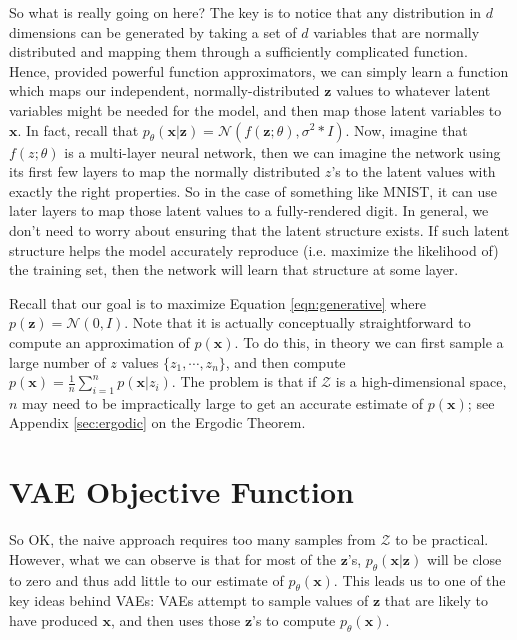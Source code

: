 \documentclass[11pt, oneside]{article}   	%
\begin{document}
\bigskip
\noindent
So what is really going on here? The key is to notice that any distribution in $d$ dimensions can be generated by taking a set of $d$ variables that are normally distributed and mapping them through a sufficiently complicated function. Hence, provided powerful function approximators, we can simply learn a function which maps our independent, normally-distributed $\mathbf{z}$ values to whatever latent variables might be needed for the model, and then map those latent variables to $\mathbf{x}$. In fact, recall that $p_{\theta}(\mathbf{x}|\mathbf{z}) = \mathcal{N}(f (\mathbf{z}; \theta), \sigma^2 * I)$. Now, imagine that  $f (z; \theta)$ is a multi-layer neural network, then we can imagine the network using its first few layers to map the normally distributed $z$'s to the latent values with exactly the right properties.  So in the case of something like MNIST, it can use later layers to map those latent values to a fully-rendered digit. In general, we don't need to worry about ensuring that the latent structure exists. If such latent structure helps the model accurately reproduce (i.e. maximize the likelihood of) the training set, then the network will learn that structure at some layer.

\bigskip
\noindent
Recall that our goal is to maximize Equation \ref{eqn:generative} where $p(\mathbf{z}) = \mathcal{N}(0,I)$. 
Note that it is actually conceptually straightforward to compute an approximation of $p(\mathbf{x})$. To do this, in theory we can first sample a large number of $z$ values $\{z_1, \cdots, z_n\}$, and then compute 
$p(\mathbf{x}) = \frac{1}{n} \sum\limits_{i = 1}^{n} p(\mathbf{x}|z_i)$. The problem is that if $\mathcal{Z}$ is a high-dimensional space, $n$ may need to be impractically large to get an accurate estimate of $p(\mathbf{x})$; see Appendix \ref{sec:ergodic} on the Ergodic Theorem.

\section{VAE Objective Function}

So OK, the naive approach requires too many samples from $\mathcal{Z}$ to be practical. However, what we can observe is that for most of the $\mathbf{z}$'s, $p_{\theta}(\mathbf{x}|\mathbf{z})$ will be close to zero and thus add little to our estimate of $p_{\theta}(\mathbf{x})$. This leads us to one of the key ideas behind VAEs: VAEs attempt to sample values of $\mathbf{z}$ that are likely to have produced $\mathbf{x}$, and then uses those $\mathbf{z}$'s to compute $p_{\theta}(\mathbf{x})$.
\end{document}
